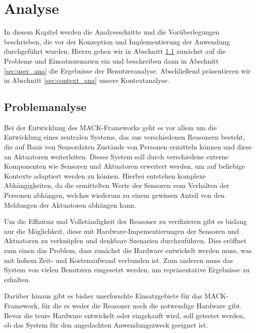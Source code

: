 \chapter{Analyse}\label{chapter:analysis}
In diesem Kapitel werden die Analyseschritte und die Vorüberlegungen beschrieben, die vor der Konzeption und Implementierung der Anwendung durchgeführt wurden. Hierzu gehen wir in Abschnitt \ref{sec:problem_ana} zunächst auf die Probleme und Einsatzszenarien ein und beschreiben dann in Abschnitt \ref{sec:user_ana} die Ergebnisse der Benutzeranalyse. Abschließend präsentieren wir in Abschnitt \ref{sec:context_ana} unsere Kontextanalyse.


\section{Problemanalyse}\label{sec:problem_ana}
Bei der Entwicklung des MACK-Frameworks geht es vor allem um die Entwicklung eines zentralen Systems, das aus verschiedenen Reasonern besteht, die auf Basis von Sensordaten Zustände von Personen ermitteln können und diese an Aktuatoren weiterleiten. Dieses System soll durch verschiedene externe Komponenten wie Sensoren und Aktuatoren erweitert werden, um auf beliebige Kontexte adaptiert werden zu können. Hierbei entstehen komplexe Abhängigkeiten, da die ermittelten Werte der Sensoren vom Verhalten der Personen abhängen, welches wiederum zu einem gewissen Anteil von den Meldungen der Aktuatoren abhängen kann.

Um die Effizienz und Vollständigkeit der Reasoner zu verifizieren gibt es bislang nur die Möglichkeit, diese mit Hardware-Impementierungen der Sensoren und Aktuatoren zu verknüpfen und denkbare Szenarien durchzuführen. Dies eröffnet zum einen das Problem, dass zunächst die Hardware entwickelt werden muss, was mit hohem Zeit- und Kostenaufwand verbunden ist. Zum anderen muss das System von vielen Benutzern eingesetzt werden, um repräsentative Ergebnisse zu erhalten.

Darüber hinaus gibt es bisher unerforschte Einsatzgebiete für das MACK-Framework, für die es weder die Reasoner noch die notwendige Hardware gibt. Bevor die teure Hardware entwickelt oder eingekauft wird, soll getestet werden, ob das System für den angedachten Anwendungszweck geeignet ist.

